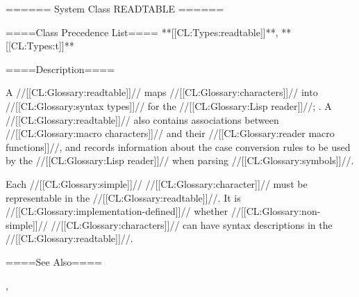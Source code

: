====== System Class READTABLE ======

====Class Precedence List==== **[[CL:Types:readtable]]**, **[[CL:Types:t]]**

====Description====

A //[[CL:Glossary:readtable]]// maps //[[CL:Glossary:characters]]// into //[[CL:Glossary:syntax types]]// for the //[[CL:Glossary:Lisp reader]]//; \seechapter\Syntax. A //[[CL:Glossary:readtable]]// also contains associations between //[[CL:Glossary:macro characters]]// and their //[[CL:Glossary:reader macro functions]]//, and records information about the case conversion rules to be used by the //[[CL:Glossary:Lisp reader]]// when parsing //[[CL:Glossary:symbols]]//.

Each //[[CL:Glossary:simple]]// //[[CL:Glossary:character]]// must be representable in the //[[CL:Glossary:readtable]]//. It is //[[CL:Glossary:implementation-defined]]// whether //[[CL:Glossary:non-simple]]// //[[CL:Glossary:characters]]// can have syntax descriptions in the //[[CL:Glossary:readtable]]//.

====See Also====

{\secref\Readtables}, {\secref\PrintingOtherObjects}

